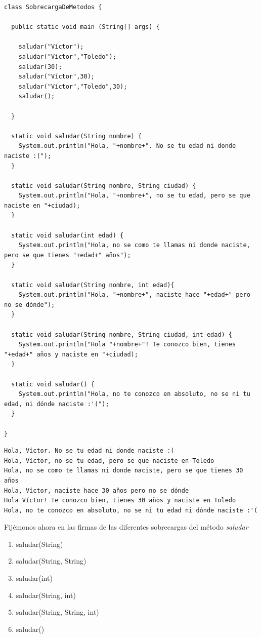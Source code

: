 \documentclass[11pt]{article}
\begin{document}
\begin{verbatim}
class SobrecargaDeMetodos {

  public static void main (String[] args) {

    saludar("Víctor");
    saludar("Víctor","Toledo");
    saludar(30);
    saludar("Víctor",30);
    saludar("Víctor","Toledo",30);
    saludar();

  }

  static void saludar(String nombre) {
    System.out.println("Hola, "+nombre+". No se tu edad ni donde naciste :(");
  }

  static void saludar(String nombre, String ciudad) {
    System.out.println("Hola, "+nombre+", no se tu edad, pero se que naciste en "+ciudad);
  }

  static void saludar(int edad) {
    System.out.println("Hola, no se como te llamas ni donde naciste, pero se que tienes "+edad+" años");
  }

  static void saludar(String nombre, int edad){
    System.out.println("Hola, "+nombre+", naciste hace "+edad+" pero no se dónde");
  }

  static void saludar(String nombre, String ciudad, int edad) {
    System.out.println("Hola "+nombre+"! Te conozco bien, tienes "+edad+" años y naciste en "+ciudad);
  }

  static void saludar() {
    System.out.println("Hola, no te conozco en absoluto, no se ni tu edad, ni dónde naciste :'(");
  }

}
\end{verbatim}

\begin{verbatim}
Hola, Víctor. No se tu edad ni donde naciste :(
Hola, Víctor, no se tu edad, pero se que naciste en Toledo
Hola, no se como te llamas ni donde naciste, pero se que tienes 30 años
Hola, Víctor, naciste hace 30 años pero no se dónde
Hola Víctor! Te conozco bien, tienes 30 años y naciste en Toledo
Hola, no te conozco en absoluto, no se ni tu edad ni dónde naciste :'(
\end{verbatim}

Fijémonos ahora en las firmas de las diferentes sobrecargas del método \emph{saludar}
\begin{enumerate}
\item saludar(String)
\item saludar(String, String)
\item saludar(int)
\item saludar(String, int)
\item saludar(String, String, int)
\item saludar()
\end{enumerate}
\end{document}

